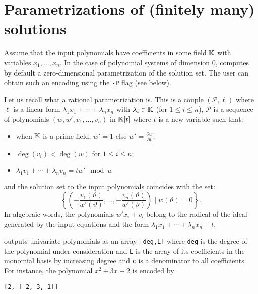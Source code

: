 \documentclass[a4paper,english,11pt]{scrartcl}
\theoremstyle{definition}
\theoremstyle{remark}
\def\leq{\leqslant}
\begin{document}
\section{Parametrizations of (finitely many) solutions}
\label{sec:param}

Assume that the input polynomials have coefficients in some field $\mathbb{K}$ with
variables $x_1, \ldots, x_n$. In the case of polynomial systems of dimension
$0$, \msolve computes by default a zero-dimensional parametrization of the
solution set. The user can obtain such an encoding using the \verb+-P+ flag 
(see below).

Let us recall what a rational parametrization is.
This is a couple $(\mathscr{P}, \ell)$ where $\ell$ is a linear form $\lambda_1
x_1 + \cdots + \lambda_n x_n$ with $\lambda_i\in \mathbb{K}$ (for $1\leq i \leq n$),
$\mathscr{P}$ is a sequence of polynomials $(w, w', v_1, \ldots, v_n)$ in
$\mathbb{K}[t]$ where $t$ is a new variable such that:
\begin{itemize}
\item when $\mathbb{K}$ is a prime field, $w'=1$ else $w' = \frac{\partial w}{\partial
    t}$;
\item $\deg(v_i) < \deg(w)$ for $1\leq i \leq n$;
\item $\lambda_1 v_1 +\cdots +\lambda_n v_n = tw' \mod w$
\end{itemize}
and the solution set to the input polynomials coincides with the set:
\[
\left \{\left (-\frac{v_1(\vartheta)}{w'(\vartheta)}, \ldots,
  -\frac{v_n(\vartheta)}{w'(\vartheta)}\right ) \mid w(\vartheta) = 0
\right\}.
\]
In algebraic words, the polynomials \(w' x_i + v_i\) belong to the radical of the 
ideal generated by the input equations and the form \(\lambda_1 x_1 + \cdots +
\lambda_n x_n + t\). 

\msolve outputs univariate polynomials as an array \verb+[deg,L]+ where
\verb+deg+ is the degree of the polynomial under consideration and \verb+L+ is
the array of its coefficients in the monomial basis by increasing degree and 
\verb+c+ is a denominator to all coefficients. For instance, the polynomial 
\(x^2+3x-2\) is encoded by 
\begin{verbatim}
[2, [-2, 3, 1]]
\end{verbatim}
\end{document}
